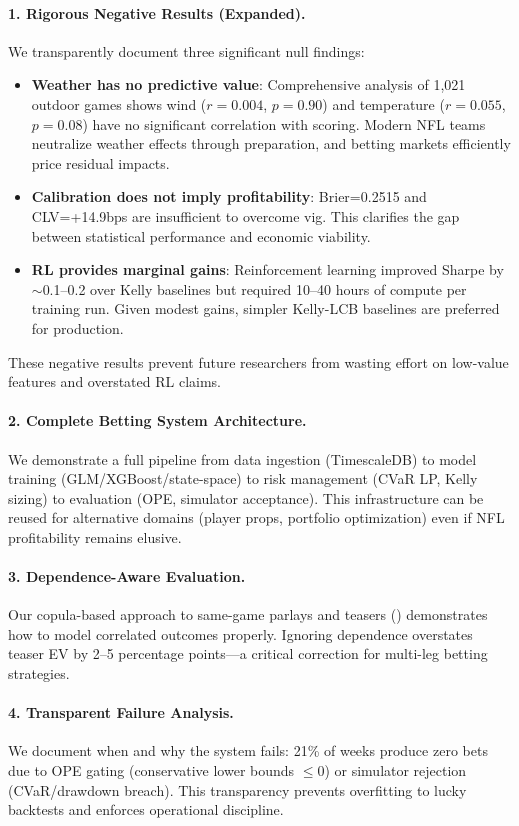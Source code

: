 \paragraph{1. Rigorous Negative Results (Expanded).}
We transparently document three significant null findings:
\begin{itemize}
  \item \textbf{Weather has no predictive value}: Comprehensive analysis of 1,021 outdoor games shows wind ($r=0.004$, $p=0.90$) and temperature ($r=0.055$, $p=0.08$) have no significant correlation with scoring. Modern NFL teams neutralize weather effects through preparation, and betting markets efficiently price residual impacts.
  \item \textbf{Calibration does not imply profitability}: Brier=0.2515 and CLV=+14.9bps are insufficient to overcome vig. This clarifies the gap between statistical performance and economic viability.
  \item \textbf{RL provides marginal gains}: Reinforcement learning improved Sharpe by $\sim$0.1--0.2 over Kelly baselines but required 10--40 hours of compute per training run. Given modest gains, simpler Kelly-LCB baselines are preferred for production.
\end{itemize}

These negative results prevent future researchers from wasting effort on low-value features and overstated RL claims.

\paragraph{2. Complete Betting System Architecture.}
We demonstrate a full pipeline from data ingestion (TimescaleDB) to model training (GLM/XGBoost/state-space) to risk management (CVaR LP, Kelly sizing) to evaluation (OPE, simulator acceptance). This infrastructure can be reused for alternative domains (player props, portfolio optimization) even if NFL profitability remains elusive.

\paragraph{3. Dependence-Aware Evaluation.}
Our copula-based approach to same-game parlays and teasers () demonstrates how to model correlated outcomes properly. Ignoring dependence overstates teaser EV by 2--5 percentage points—a critical correction for multi-leg betting strategies.

\paragraph{4. Transparent Failure Analysis.}
We document when and why the system fails: 21\% of weeks produce zero bets due to OPE gating (conservative lower bounds $\le 0$) or simulator rejection (CVaR/drawdown breach). This transparency prevents overfitting to lucky backtests and enforces operational discipline.

